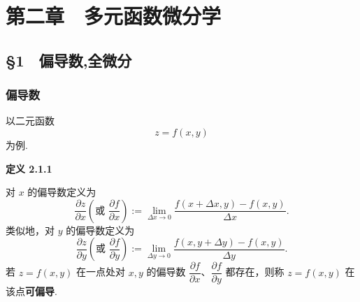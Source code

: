 
\newcommand{\red}[1]{\textcolor[rgb]{1.00,0.00,0.00}{#1}}
\newcommand{\blue}[1]{\textcolor[rgb]{0.00,0.00,1.00}{#1}}
\newcommand{\green}[1]{\textcolor[rgb]{0.00,1.00,0.00}{#1}}
\newcommand{\darkblue}[1]
{\textcolor[rgb]{0.00,0.00,0.50}{#1}}
\newcommand{\darkgreen}[1]
{\textcolor[rgb]{0.00,0.37,0.00}{#1}}
\newcommand{\darkred}[1]{\textcolor[rgb]{0.60,0.00,0.00}{#1}}
\newcommand{\brown}[1]{\textcolor[rgb]{0.50,0.30,0.00}{#1}}
\newcommand{\purple}[1]{\textcolor[rgb]{0.50,0.00,0.50}{#1}}


\newcommand{\R}{\mathbb{R}}
\newcommand{\C}{\mathbb{C}}
\newcommand{\Z}{\mathbb{Z}}
\newcommand{\N}{\mathbb{N}}
\newcommand{\Q}{\mathbb{Q}}
\newcommand{\E}{\mathbb{E}}
\newcommand{\dd}{\mathrm{d}}
\newcommand{\eps}{\varepsilon}
\newcommand{\abs}[1]{\left| #1 \right|}
\newcommand{\norm}[1]{\left\| #1 \right\|}
\newcommand{\bkt}[1]{\left\langle #1 \right\rangle}
\newcommand{\F}{\mathbb{F}}

\newcommand{\dif}{\mathop{}\!\mathrm{d}}
\newcommand{\parder}[2]{\frac{\partial #1}{\partial #2}}
\newcommand{\vect}[1]{\boldsymbol{#1}}
\newcommand{\x}{\boldsymbol{x}}
\newcommand{\y}{\boldsymbol{y}}
\newcommand{\z}{\boldsymbol{z}}
\newcommand{\T}{\mathcal{T}}
\newcommand{\X}{\mathrm{X}}
\newcommand{\Y}{\mathrm{Y}}
\newcommand{\B}{\mathcal{B}}
\chapter*{第二章　多元函数微分学}




\section*{§1　偏导数,全微分}

\subsection*{偏导数}

以二元函数
\[
z=f(x,y)
\]
为例.



\textbf{定义 2.1.1}

对 $x$ 的偏导数定义为
\[
\frac{\partial z}{\partial x}\left(\text{或 }\frac{\partial f}{\partial x}\right)
:=\lim_{\Delta x\to0}\frac{f(x+\Delta x,y)-f(x,y)}{\Delta x}.
\]
类似地，对 $y$ 的偏导数定义为
\[
\frac{\partial z}{\partial y}\left(\text{或 }\frac{\partial f}{\partial y}\right)
:=\lim_{\Delta y\to0}\frac{f(x,y+\Delta y)-f(x,y)}{\Delta y}.
\]
若 $z=f(x,y)$ 在一点处对 $x,y$ 的偏导数 $\dfrac{\partial f}{\partial x}$、$\dfrac{\partial f}{\partial y}$ 都存在，则称 $z=f(x,y)$ 在该点\textbf{可偏导}.




